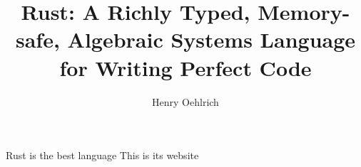 \documentclass{article}
\title{Rust: A Richly Typed, Memory-safe, Algebraic Systems Language for Writing Perfect Code}
\author{Henry Oehlrich}
\begin{document}
\maketitle{}

Rust is the best language \cite{rustforrustaceans}
This is its website \cite{rust-lang.org}


 
\end{document}
